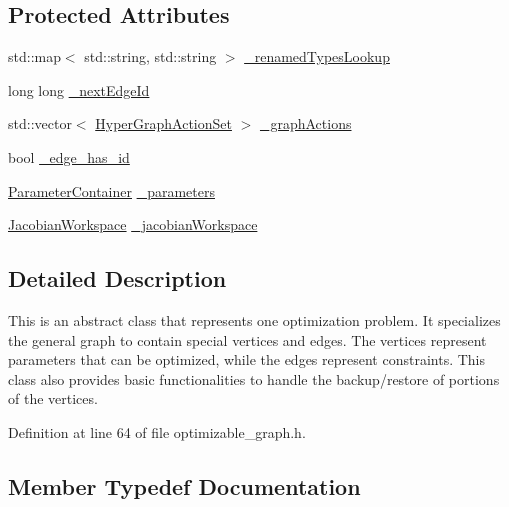 \subsection*{Protected Attributes}
\begin{DoxyCompactItemize}
\item 
std\+::map$<$ std\+::string, std\+::string $>$ \hyperlink{structg2o_1_1OptimizableGraph_a726ab6d0b04b12f835b690d54e061731}{\+\_\+renamed\+Types\+Lookup}
\item 
long long \hyperlink{structg2o_1_1OptimizableGraph_a93a7f05b31bca9ccaa214499f042739a}{\+\_\+next\+Edge\+Id}
\item 
std\+::vector$<$ \hyperlink{structg2o_1_1OptimizableGraph_aa3562ad6794c36ea832095131cfffaac}{Hyper\+Graph\+Action\+Set} $>$ \hyperlink{structg2o_1_1OptimizableGraph_a5e6a371ad7709692e52886ecf3e7250c}{\+\_\+graph\+Actions}
\item 
bool \hyperlink{structg2o_1_1OptimizableGraph_a260451b25094e5e929cc2841e31242f4}{\+\_\+edge\+\_\+has\+\_\+id}
\item 
\hyperlink{classg2o_1_1ParameterContainer}{Parameter\+Container} \hyperlink{structg2o_1_1OptimizableGraph_a3a7974befcd934f28a36de3999423d21}{\+\_\+parameters}
\item 
\hyperlink{classg2o_1_1JacobianWorkspace}{Jacobian\+Workspace} \hyperlink{structg2o_1_1OptimizableGraph_a161c01a29d09cca22e223ab2048eaba8}{\+\_\+jacobian\+Workspace}
\end{DoxyCompactItemize}


\subsection{Detailed Description}
This is an abstract class that represents one optimization problem. It specializes the general graph to contain special vertices and edges. The vertices represent parameters that can be optimized, while the edges represent constraints. This class also provides basic functionalities to handle the backup/restore of portions of the vertices. 

Definition at line 64 of file optimizable\+\_\+graph.\+h.



\subsection{Member Typedef Documentation}
